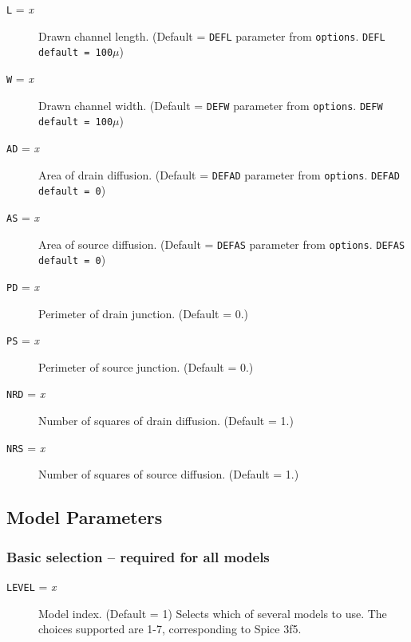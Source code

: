 \begin{description}

\item[{\tt L} = {\it x}] Drawn channel length.  (Default = {\tt DEFL}
parameter from {\tt options}. {\tt DEFL default = 100$\mu$})

\item[{\tt W} = {\it x}] Drawn channel width.  (Default = {\tt DEFW}
parameter from {\tt options}. {\tt DEFW default = 100$\mu$})

\item[{\tt AD} = {\it x}] Area of drain diffusion.  (Default = {\tt DEFAD}
parameter from {\tt options}. {\tt DEFAD default = 0})

\item[{\tt AS} = {\it x}] Area of source diffusion.  (Default = {\tt DEFAS}
parameter from {\tt options}. {\tt DEFAS default = 0})

\item[{\tt PD} = {\it x}] Perimeter of drain junction.  (Default = 0.)

\item[{\tt PS} = {\it x}] Perimeter of source junction.  (Default = 0.)

\item[{\tt NRD} = {\it x}] Number of squares of drain diffusion.  
(Default = 1.)

\item[{\tt NRS} = {\it x}] Number of squares of source diffusion.  
(Default = 1.)

\end{description}


\subsection{Model Parameters}

\subsubsection{Basic selection -- required for all models}
\begin{description}

\item[{\tt LEVEL} = {\it x}] Model index. (Default = 1) Selects which
of several models to use.  The choices supported are 1-7,
corresponding to Spice 3f5.

\end{description}
